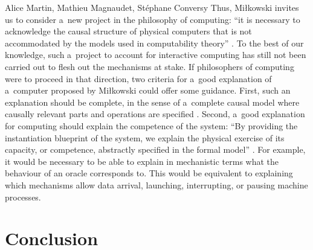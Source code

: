\begin{artengenv2auth}{Alice Martin, Mathieu Magnaudet, Stéphane Conversy}
Thus, Miłkowski invites us to consider a~new project in the philosophy of computing: ``it is necessary to acknowledge the causal structure of physical computers that is not accommodated by the models used in computability theory'' \parencite{Mikowski2011}. To the best of our knowledge, such a~project to account for interactive computing has still not been carried out to flesh out the mechanisms at stake. If philosophers of computing were to proceed in that direction, two criteria for a~good explanation of a~computer proposed by Miłkowski could offer some guidance. First, such an explanation should be complete, in the sense of a~complete causal model where causally relevant parts and operations are specified \parencite{Mikowski2014}. Second, a~good explanation for computing should explain the competence of the system: ``By providing the instantiation blueprint of the system, we explain the physical exercise of its capacity, or competence, abstractly specified in the formal model'' \parencite{Mikowski2014}. For example, it would be necessary to be able to explain in mechanistic terms what the behaviour of an oracle corresponds to. This would be equivalent to explaining which mechanisms allow data arrival, launching, interrupting, or pausing machine processes.

\section*{Conclusion} 


\end{artengenv2auth}
